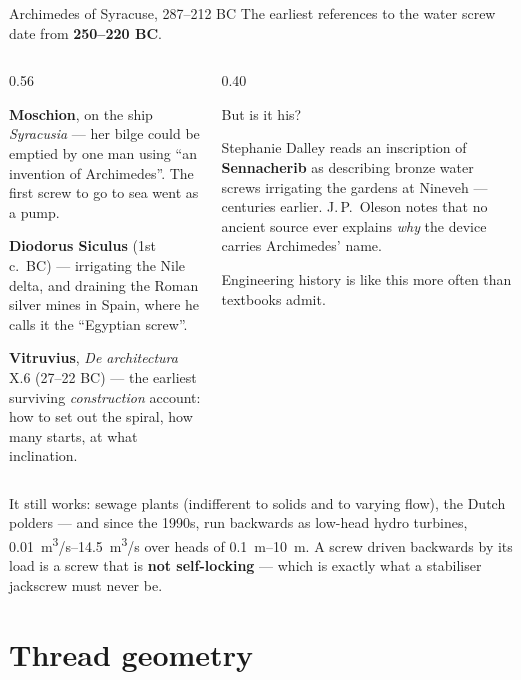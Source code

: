 \documentclass[aspectratio=169,10pt]{beamer}
\begin{document}
\begin{frame}{Archimedes of Syracuse, 287--212 BC}
The earliest references to the water screw date from \textbf{250--220 BC}.
\vfill
\begin{columns}[T]
\begin{column}{0.56\textwidth}
{\footnotesize
\textbf{Moschion}, on the ship \emph{Syracusia} --- her bilge could be emptied by \alert{one man}
using ``an invention of Archimedes''. The first screw to go to sea went as a pump.
\vspace{3pt}

\textbf{Diodorus Siculus} (1st c.\ BC) --- irrigating the Nile delta, and draining the Roman silver
mines in Spain, where he calls it the ``Egyptian screw''.
\vspace{3pt}

\textbf{Vitruvius}, \emph{De architectura} X.6 (27--22 BC) --- the earliest surviving
\emph{construction} account: how to set out the spiral, how many starts, at what inclination.}
\end{column}
\begin{column}{0.40\textwidth}
\begin{alertblock}{\normalsize But is it his?}
{\footnotesize Stephanie Dalley reads an inscription of \textbf{Sennacherib} as describing bronze
water screws irrigating the gardens at Nineveh --- centuries earlier. J.\,P.\ Oleson notes that no
ancient source ever explains \emph{why} the device carries Archimedes' name.
\vspace{3pt}

Engineering history is like this more often than textbooks admit.}
\end{alertblock}
\end{column}
\end{columns}
\vfill
{\footnotesize It still works: sewage plants (indifferent to solids and to varying flow), the Dutch
polders --- and since the 1990s, run \alert{backwards} as low-head hydro turbines,
\SIrange{0.01}{14.5}{m^3/s} over heads of \SIrange{0.1}{10}{m}. A screw driven backwards by its load
is a screw that is \textbf{not self-locking} --- which is exactly what a stabiliser jackscrew must
never be.}
\end{frame}

\section{Thread geometry}
\end{document}
